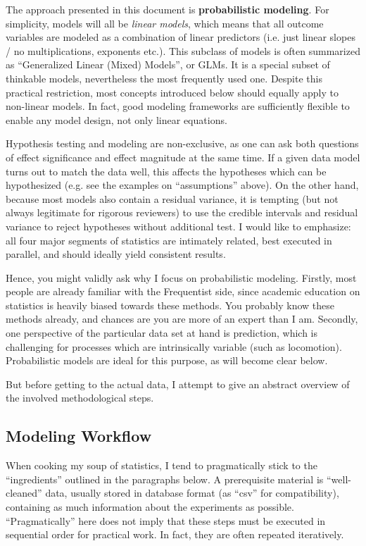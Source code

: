 The approach presented in this document is \textbf{probabilistic modeling}.
For simplicity, models will all be \emph{linear models}, which means that all outcome variables are modeled as a combination of linear predictors (i.e. just linear slopes / no multiplications, exponents etc.).
This subclass of models is often summarized as ``Generalized Linear (Mixed) Models'', or GLMs.
It is a special subset of thinkable models, nevertheless the most frequently used one.
Despite this practical restriction, most concepts introduced below should equally apply to non-linear models.
In fact, good modeling frameworks are sufficiently flexible to enable any model design, not only linear equations.
\bigskip


Hypothesis testing and modeling are non-exclusive, as one can ask both questions of effect significance and effect magnitude at the same time.
If a given data model turns out to match the data well, this affects the hypotheses which can be hypothesized (e.g. see the examples on ``assumptions'' above).
On the other hand, because most models also contain a residual variance, it is tempting (but not always legitimate for rigorous reviewers) to use the credible intervals and residual variance to reject hypotheses without additional test.
I would like to emphasize: all four major segments of statistics are intimately related, best executed in parallel, and should ideally yield consistent results.

Hence, you might validly ask why I focus on probabilistic modeling.
Firstly, most people are already familiar with the Frequentist side, since academic education on statistics is heavily biased towards these methods.
You probably know these methods already, and chances are you are more of an expert than I am.
Secondly, one perspective of the particular data set at hand is prediction, which is challenging for processes which are intrinsically variable (such as locomotion).
Probabilistic models are ideal for this purpose, as will become clear below.

But before getting to the actual data, I attempt to give an abstract overview of the involved methodological steps.

\clearpage
\subsection{Modeling Workflow}
\label{intro:workflow}
When cooking my soup of statistics, I tend to pragmatically stick to the ``ingredients'' outlined in the paragraphs below.
A prerequisite material is ``well-cleaned'' data, usually stored in database format (as ``csv'' for compatibility), containing as much information about the experiments as possible.
``Pragmatically'' here does not imply that these steps must be executed in sequential order for practical work.
In fact, they are often repeated iteratively.


